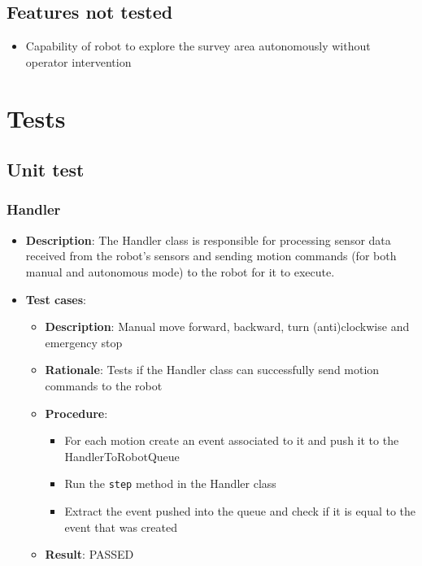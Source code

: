 \documentclass[12pt,a4paper]{article}
\begin{document}
	\subsection{Features not tested}
	\begin{itemize}
		\item Capability of robot to explore the survey area autonomously without operator intervention
	\end{itemize}
	
	\section{Tests}
	\subsection{Unit test}
	\subsubsection{Handler}
	\begin{itemize}
	\item \textbf{Description}: The Handler class is responsible for processing sensor data received from the robot's sensors and sending motion commands (for both manual and autonomous mode) to the robot for it to execute.
	\item \textbf{Test cases}:
	\begin{itemize}
		\item \textbf{Description}:	Manual move forward, backward, turn (anti)clockwise and emergency stop
		\item \textbf{Rationale}:	Tests if the Handler class can successfully send motion commands to the robot
		\item \textbf{Procedure}:
		\begin{itemize}
			\item For each motion create an event associated to it and push it to the HandlerToRobotQueue
			\item Run the \texttt{step} method in the Handler class
			\item Extract the event pushed into the queue and check if it is equal to the event that was created
		\end{itemize}
		\item \textbf{Result}: PASSED
	\end{itemize}
	\end{itemize}
	
\end{document}
